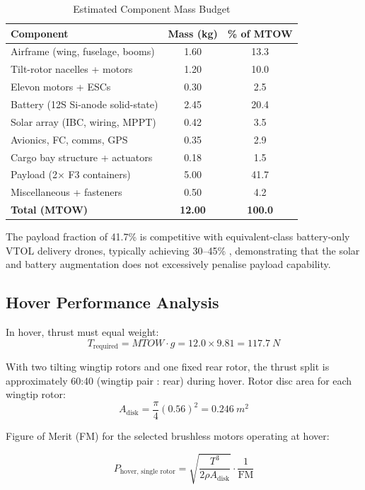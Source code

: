 \documentclass[conference]{IEEEtran}
\begin{document}
\begin{table}[H]
\centering
\caption{Estimated Component Mass Budget}
\label{tab:mass}
\renewcommand{\arraystretch}{1.3}
\begin{tabular}{lcc}
\toprule
\textbf{Component} & \textbf{Mass (kg)} & \textbf{\% of MTOW} \\
\midrule
Airframe (wing, fuselage, booms) & 1.60 & 13.3 \\
Tilt-rotor nacelles + motors     & 1.20 & 10.0 \\
Elevon motors + ESCs             & 0.30 & 2.5  \\
Battery (12S Si-anode solid-state)& 2.45 & 20.4 \\
Solar array (IBC, wiring, MPPT)  & 0.42 & 3.5  \\
Avionics, FC, comms, GPS         & 0.35 & 2.9  \\
Cargo bay structure + actuators  & 0.18 & 1.5  \\
Payload (2× F3 containers)       & 5.00 & 41.7 \\
Miscellaneous + fasteners        & 0.50 & 4.2  \\
\midrule
\textbf{Total (MTOW)}            & \textbf{12.00} & \textbf{100.0} \\
\bottomrule
\end{tabular}
\end{table}

The payload fraction of 41.7\% is competitive with equivalent-class
battery-only VTOL delivery drones, typically achieving 30--45\%
\citep{b8},
demonstrating that the solar and battery augmentation does not excessively
penalise payload capability.

\subsection{Hover Performance Analysis}

In hover, thrust must equal weight:
\[
T_{\text{required}} = MTOW \cdot g = 12.0 \times 9.81 = \SI{117.7}{N}
\]

With two tilting wingtip rotors and one fixed rear rotor,
the thrust split is approximately 60:40 (wingtip pair : rear) during hover.
Rotor disc area for each wingtip rotor:
\[
A_{\text{disk}} = \frac{\pi}{4}(0.56)^2 = \SI{0.246}{m^2}
\]

Figure of Merit (FM) for the selected brushless motors operating at hover:

\[
P_{\text{hover, single rotor}} = \sqrt{\frac{T^3}{2\rho A_{\text{disk}}}} \cdot \frac{1}{\text{FM}}
\]
\end{document}
